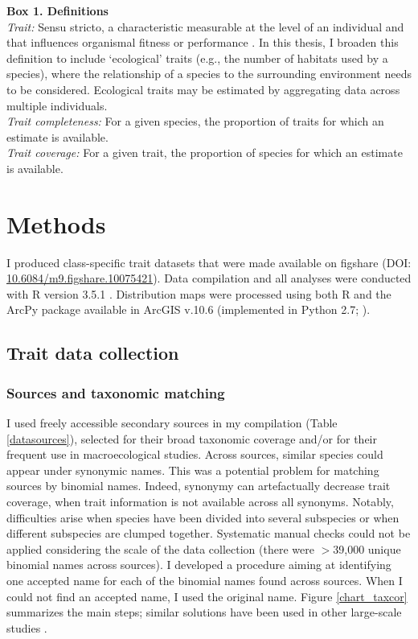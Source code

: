\clearpage

\begin{mdframed}
\label{Trait_definition_box}
\textbf{Box 1. Definitions}\\
\textit{Trait:} Sensu stricto, a characteristic measurable at the level of an individual and that influences organismal fitness or performance \citep{Violle2007}. In this thesis, I broaden this definition to include `ecological' traits (e.g., the number of habitats used by a species), where the relationship of a species to the surrounding environment needs to be considered. Ecological traits may be estimated by aggregating data across multiple individuals.\\
\textit{Trait completeness:} For a given species, the proportion of traits for which an estimate is available.\\
\textit{Trait coverage:} For a given trait, the proportion of species for which an estimate is available.
\end{mdframed}


\section{Methods}

I produced class-specific trait datasets that were made available on figshare (DOI: \url{10.6084/m9.figshare.10075421}).
Data compilation and all analyses were conducted with R version 3.5.1 \citep{R_citation}.
Distribution maps were processed using both R and the ArcPy package available in ArcGIS v.10.6 \citep{ESRI} (implemented in Python 2.7; \citet{Python_citation}).

\subsection{Trait data collection}

\subsubsection{Sources and taxonomic matching}

I used freely accessible secondary sources in my compilation (Table \ref{datasources}), selected for their broad taxonomic coverage and/or for their frequent use in macroecological studies. Across sources, similar species could appear under synonymic names. This was a potential problem for matching sources by binomial names. Indeed, synonymy can artefactually decrease trait coverage, when trait information is not available across all synonyms. Notably, difficulties arise when species have been divided into several subspecies or when different subspecies are clumped together. Systematic manual checks could not be applied considering the scale of the data collection (there were $>$39,000 unique binomial names across sources). I developed a procedure aiming at identifying one accepted name for each of the binomial names found across sources. When I could not find an accepted name, I used the original name. Figure \ref{chart_taxcor} summarizes the main steps; similar solutions have been used in other large-scale studies \citep{Cooke2019b}.

